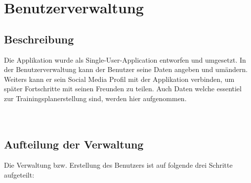 \documentclass[FIPLY_base.tex]{subfiles}
\author{Gerald Irsiegler}
\date{26. Februar 2016}
\begin{document}
\section{Benutzerverwaltung}
\subsection{Beschreibung}
Die Applikation wurde als Single-User-Application entworfen und umgesetzt. In der Benutzerverwaltung kann der Benutzer seine
Daten angeben und umändern. Weiters kann er sein Social Media Profil mit der Applikation verbinden, um später Fortschritte mit seinen Freunden zu teilen.
Auch Daten welche essentiel zur Trainingsplanerstellung sind, werden hier aufgenommen.
\\\
\\\

\subsection{Aufteilung der Verwaltung}
Die Verwaltung bzw. Erstellung des Benutzers ist auf folgende drei Schritte aufgeteilt:
\end{document}
